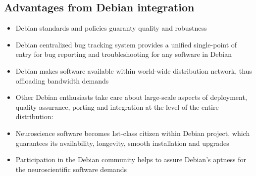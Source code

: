 \documentclass[letterpaper,landscape]{report}
\begin{document}
\begin{multicols}{3}
\subsection*{Advantages from Debian integration}

\begin{itemize}[nolistsep,leftmargin=1pc]

\item Debian standards and policies guaranty quality and robustness

\item Debian centralized bug tracking system provides a unified
  single-point of entry for bug reporting and troubleshooting for any
  software in Debian

\item Debian makes software available within world-wide distribution
  network, thus offloading bandwidth demands

\item Other Debian enthusiasts take care about large-scale aspects of
  deployment, quality assurance, porting and integration at the level
  of the entire distribution:


\item Neuroscience software becomes 1st-class citizen within Debian
  project, which guarantees its availability, longevity, smooth
  installation and upgrades

\item Participation in the Debian community helps to assure Debian's
  aptness for the neuroscientific software demands

\end{itemize}



\end{multicols}
\end{document}
